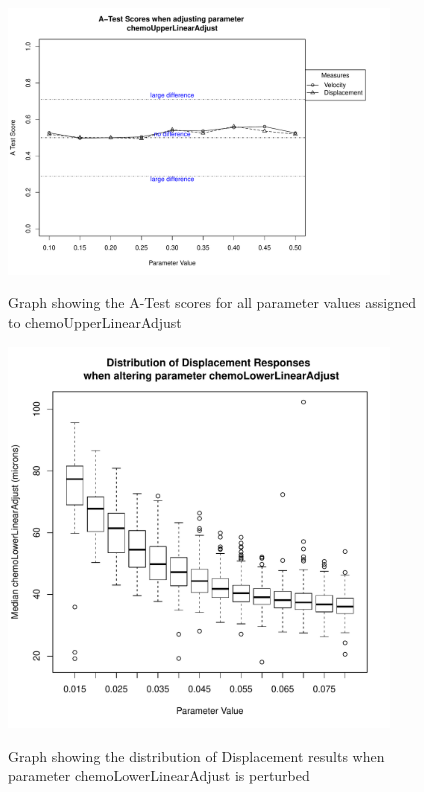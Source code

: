 \documentclass[a4paper,11pt]{article}
\begin{document}
\begin{figure}[h!]
\centering
    \includegraphics[width=0.9\textwidth]{OAT_chemoUpperLinearAdjust.pdf}\\ \noindent
    \caption{Graph showing the A-Test scores for all parameter values assigned to chemoUpperLinearAdjust}
    \label{OAT_Results2}
\end{figure}

\newpage 
\begin{figure}[h!]
\centering
    \includegraphics[width=0.9\textwidth]{chemoLowerLinearAdjust_DisplacementBP.pdf}\\ \noindent
    \caption{Graph showing the distribution of Displacement results when parameter chemoLowerLinearAdjust is perturbed}
    \label{OAT_Results3}
    \end{figure}
\end{document}
